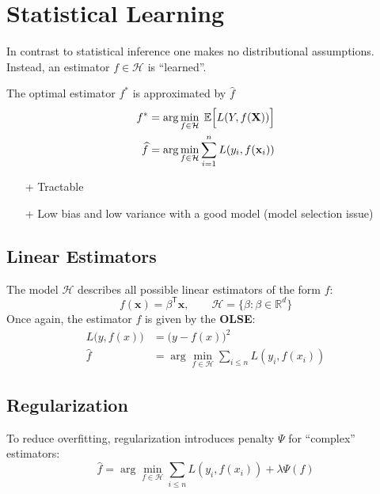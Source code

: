 \section{Statistical Learning}
In contrast to statistical inference one makes no distributional assumptions. Instead, an estimator $f\in \mathcal{H}$ is ``learned''.

The optimal estimator $f^*$ is approximated by $\widehat{f}$
\noindent\begin{align*}
    f^*         & = \arg\min_{f\in \mathcal{H}}\; \mathbb{E}\Bigl[L(Y,f(\mathbf{X}))\Bigr] \\
    \widehat{f} & = \arg\min_{f\in \mathcal{H}} \sum_{i=1}^{n}L(y_i,f(\mathbf{x}_i))
\end{align*}

\begin{itemize}
    \item[+] Tractable
    \item[+] Low bias and low variance with a good model (model selection issue)
\end{itemize}

\subsection{Linear Estimators}
The model $\mathcal{H}$ describes all possible linear estimators of the form $f$:
\noindent\begin{equation*}
    f(\mathbf{x}) = \beta^{\mathsf{T}}\mathbf{x}, \qquad \mathcal{H} = \{\beta: \beta\in \mathbb{R}^d\}
\end{equation*}
Once again, the estimator $f$ is given by the \textbf{OLSE}:
\noindent\begin{align*}
    L\big(y,f(x)\big) & ={\big(y-f(x)\big)}^{2}                                      \\
    \widehat{f}           & =\arg\min_{f\in\mathcal{H}}\sum_{i\leq n}L(y_{i},f(x_{i}))
\end{align*}

\subsection{Regularization}\label{ssec:regularization}
To reduce overfitting, regularization introduces penalty $\Psi$ for ``complex'' estimators:
\noindent\begin{equation*}
    \widehat{f} =\arg\min_{f\in\mathcal{H}}\sum_{i\leq n}L(y_{i},f(x_{i})) + \lambda\Psi(f)
\end{equation*}
